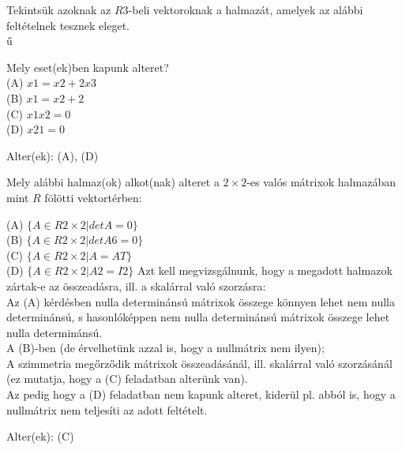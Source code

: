 \begin{frame}
  \begin{tcolorbox}[title={2/3. -R-}]
      Tekintsük azoknak az $R3$-beli  vektoroknak a halmazát, amelyek az alábbi feltételnek tesznek eleget.\\ű
      
      Mely eset(ek)ben kapunk alteret?\\
      (A) $x1 = x2 + 2x3$\\
      (B) $x1 = x2 + 2$\\
      (C) $x1x2 = 0$\\
      (D) $x2 1 = 0$
  \tcblower

    \mmedskip
    
    Alter(ek): (A), (D)
  \end{tcolorbox}
\end{frame}

\begin{frame}
  \begin{tcolorbox}[title={2/4. -Q-}]
      Mely alábbi halmaz(ok) alkot(nak) alteret a $2×2$-es valós mátrixok halmazában mint $R$ fölötti vektortérben:\\
      \mmedskip
      
      (A) $\{A ∈ R2×2|detA = 0\}$\\
      (B) $\{A ∈ R2×2|detA 6= 0\}$\\
      (C) $\{A ∈ R2×2|A = AT\}$\\
      (D) $\{A ∈ R2×2|A2 = I2\}$
  \tcblower
    Azt kell megvizsgálnunk, hogy a megadott halmazok zártak-e az összeadásra, ill. a skalárral való szorzásra:\\

    Az (A) kérdésben nulla determinánsú mátrixok összege könnyen lehet nem nulla determinánsú, s hasonlóképpen nem nulla determinánsú mátrixok összege lehet nulla determinánsú.\\
    
    A (B)-ben (de érvelhetünk azzal is, hogy a nullmátrix nem ilyen);\\

    A szimmetria megőrződik mátrixok összeadásánál, ill. skalárral való szorzásánál (ez mutatja, hogy a (C) feladatban alterünk van).\\

    Az pedig hogy a (D) feladatban nem kapunk alteret, kiderül pl. abból is, hogy a nullmátrix nem teljesíti az adott feltételt. 
    \mmedskip 
    
    Alter(ek): (C)
  \end{tcolorbox}
\end{frame}

